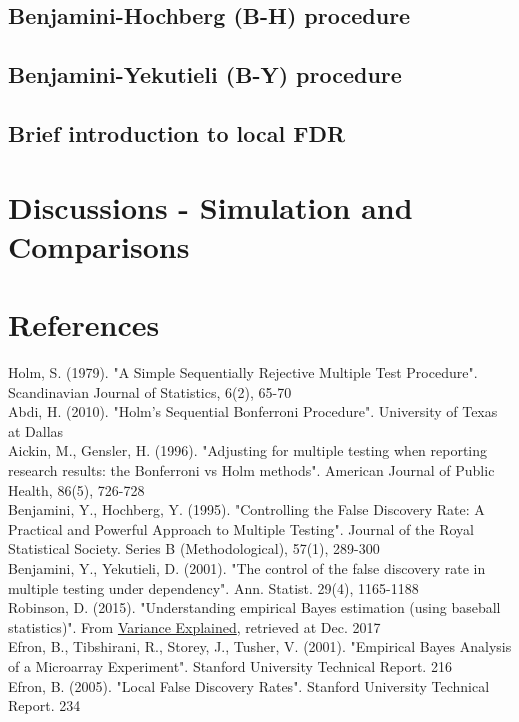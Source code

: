 \documentclass[a4paper, 11pt, oneside]{article}
\begin{document}
\subsection{Benjamini-Hochberg (B-H) procedure}
\subsection{Benjamini-Yekutieli (B-Y) procedure}
\subsection{Brief introduction to local FDR}
\vspace{0.2in}

\section{Discussions - Simulation and Comparisons}
\vspace{0.2in}

\section{References}
 Holm, S. (1979). "A Simple Sequentially Rejective Multiple Test Procedure". Scandinavian Journal of Statistics, 6(2), 65-70 \vspace{0.06in}\\
 Abdi, H. (2010). "Holm's Sequential Bonferroni Procedure". University of Texas at Dallas \vspace{0.06in}\\
 Aickin, M., Gensler, H. (1996). "Adjusting for multiple testing when reporting research results: the Bonferroni vs Holm methods". American Journal of Public Health, 86(5), 726-728 \vspace{0.06in}\\
 Benjamini, Y., Hochberg, Y. (1995). "Controlling the False Discovery Rate: A Practical and Powerful Approach to Multiple Testing". Journal of the Royal Statistical Society. Series B (Methodological), 57(1), 289-300 \vspace{0.06in}\\
 Benjamini, Y., Yekutieli, D. (2001). "The control of the false discovery rate in multiple testing under dependency". Ann. Statist. 29(4), 1165-1188 \vspace{0.06in}\\
 Robinson, D. (2015). "Understanding empirical Bayes estimation (using baseball statistics)". From \href{http://varianceexplained.org/r/empirical\_bayes\_baseball/}{Variance Explained}, retrieved at Dec. 2017 \vspace{0.06in}\\
 Efron, B., Tibshirani, R., Storey, J., Tusher, V. (2001). "Empirical Bayes Analysis of a Microarray Experiment". Stanford University Technical Report. 216 \vspace{0.06in}\\
 Efron, B. (2005). "Local False Discovery Rates". Stanford University Technical Report. 234 \vspace{0.06in}\\
\end{document}
